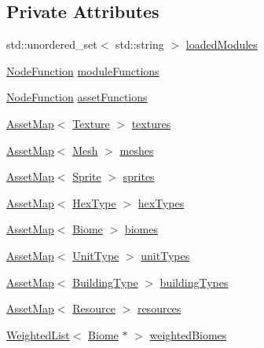 \subsection*{Private Attributes}
\begin{DoxyCompactItemize}
\item 
std\+::unordered\+\_\+set$<$ std\+::string $>$ \hyperlink{class_asset_manager_ad6b33a87ecdeaa2e5c405edfdc0b639e}{loaded\+Modules}
\item 
\hyperlink{class_asset_manager_a681158dc461420e008e0f88312bf10e9}{Node\+Function} \hyperlink{class_asset_manager_ace1c7d5843177a2b49f4fd2afa903309}{module\+Functions}
\item 
\hyperlink{class_asset_manager_a681158dc461420e008e0f88312bf10e9}{Node\+Function} \hyperlink{class_asset_manager_ab24a868424165b549fed000fbd298b3a}{asset\+Functions}
\item 
\hyperlink{class_asset_manager_a67ef2a74c058b6cebefd838bcc3a7d96}{Asset\+Map}$<$ \hyperlink{class_texture}{Texture} $>$ \hyperlink{class_asset_manager_ab8a68f50bb34f1daee3ea563c0ba31e7}{textures}
\item 
\hyperlink{class_asset_manager_a67ef2a74c058b6cebefd838bcc3a7d96}{Asset\+Map}$<$ \hyperlink{class_mesh}{Mesh} $>$ \hyperlink{class_asset_manager_a4bfad66bc0842a2299d376e2f651b31a}{meshes}
\item 
\hyperlink{class_asset_manager_a67ef2a74c058b6cebefd838bcc3a7d96}{Asset\+Map}$<$ \hyperlink{class_sprite}{Sprite} $>$ \hyperlink{class_asset_manager_a2b51544270fd1aa09654fe3241241c63}{sprites}
\item 
\hyperlink{class_asset_manager_a67ef2a74c058b6cebefd838bcc3a7d96}{Asset\+Map}$<$ \hyperlink{class_hex_type}{Hex\+Type} $>$ \hyperlink{class_asset_manager_ae18b67cef82301126542d8bf823823e6}{hex\+Types}
\item 
\hyperlink{class_asset_manager_a67ef2a74c058b6cebefd838bcc3a7d96}{Asset\+Map}$<$ \hyperlink{class_biome}{Biome} $>$ \hyperlink{class_asset_manager_aec90f1878d0758a1b4cbf39b60866635}{biomes}
\item 
\hyperlink{class_asset_manager_a67ef2a74c058b6cebefd838bcc3a7d96}{Asset\+Map}$<$ \hyperlink{class_unit_type}{Unit\+Type} $>$ \hyperlink{class_asset_manager_ad9a5e153c6a6e8eabae3c5bfcb2357e3}{unit\+Types}
\item 
\hyperlink{class_asset_manager_a67ef2a74c058b6cebefd838bcc3a7d96}{Asset\+Map}$<$ \hyperlink{class_building_type}{Building\+Type} $>$ \hyperlink{class_asset_manager_a4fea55fcfa82258972cdcbc441f89b59}{building\+Types}
\item 
\hyperlink{class_asset_manager_a67ef2a74c058b6cebefd838bcc3a7d96}{Asset\+Map}$<$ \hyperlink{class_resource}{Resource} $>$ \hyperlink{class_asset_manager_ac071054fd72641e5f66c85c757b45516}{resources}
\item 
\hyperlink{class_weighted_list}{Weighted\+List}$<$ \hyperlink{class_biome}{Biome} $\ast$ $>$ \hyperlink{class_asset_manager_adb9982a105cce102ebcf4a6cdc7644c2}{weighted\+Biomes}
\end{DoxyCompactItemize}



